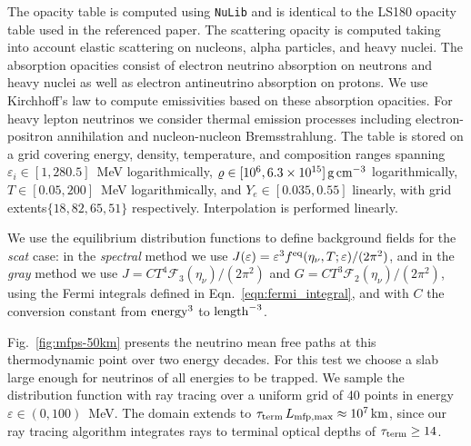 \documentclass[aps,floatfix,prd,superscriptaddress,twocolumn]{revtex4-1}
\begin{document}
The opacity table is computed using \lstinline{NuLib}
\cite{ocon2015-gr1d_with_nu}
and is identical to the LS180 opacity table used in the referenced paper.
The scattering opacity is computed taking into account elastic scattering on
nucleons, alpha particles, and heavy nuclei.
The absorption opacities consist of electron neutrino absorption on neutrons
and heavy nuclei as well as electron antineutrino absorption on protons.
We use Kirchhoff's law to compute emissivities based on these absorption
opacities.
For heavy lepton neutrinos we consider thermal emission processes including
electron-positron annihilation and nucleon-nucleon Bremsstrahlung.
The table is stored on a grid covering energy, density, temperature,
and composition
ranges spanning $\varepsilon_i\in[1,280.5]$~MeV logarithmically,
$\varrho\in[10^6,6.3\times10^{15}]\,{\rm g}\,{\rm cm}^{-3}$ logarithmically,
$T\in[0.05,200]$~MeV logarithmically, and 
$Y_e\in[0.035,0.55]$ linearly,
with grid extents$\{18,82,65,51\}$ respectively.
Interpolation is performed linearly.

We use the equilibrium distribution functions to define background
fields for the \emph{scat} case:
in the \emph{spectral} method we use
$J(\varepsilon)=\varepsilon^3 f^{\rm eq}(\eta_\nu,T;\varepsilon)/(2\pi^2)$,
and in the \emph{gray} method we use
$J=C T^4 \mathscr{F}_3(\eta_\nu)/(2\pi^2)$ and
$G=C T^3 \mathscr{F}_2(\eta_\nu)/(2\pi^2)$,
using the Fermi integrals defined in Eqn.~\ref{eqn:fermi_integral},
and with $C$ the conversion constant from ${\rm energy}^3$ to ${\rm length}^{-3}$.

Fig.~\ref{fig:mfps-50km} presents the neutrino mean free paths
at this thermodynamic point over two energy decades.
For this test we choose a slab large enough for neutrinos of all
energies to be trapped.
We sample the distribution function with ray tracing over a uniform grid
of 40 points in energy $\varepsilon \in (0,100)$~MeV.
The domain extends to $\tau_{\rm term}\,L_{\rm mfp,max}\approx10^7\,{\rm km}$,
since our ray tracing algorithm integrates rays to terminal optical
depths of $\tau_{\rm term}\geq14$.
\end{document}
